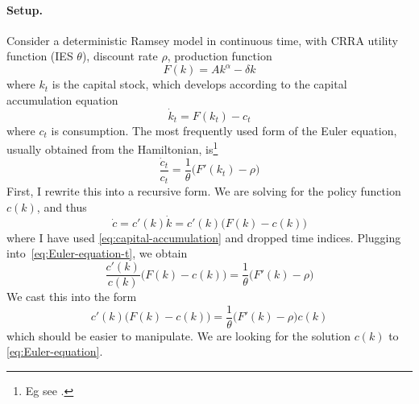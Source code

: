 \documentclass[a4paper,11pt]{article}
\begin{document}
\paragraph{Setup.} Consider a deterministic Ramsey model in continuous time, with CRRA utility function (IES $\theta$), discount rate $\rho$, production function
\begin{equation}
  F(k) = A k^\alpha - \delta k
\end{equation}
where $k_t$ is the capital stock, which develops according to the capital accumulation equation
\begin{equation}
  \label{eq:capital-accumulation}
  \dot{k}_t = F(k_t) - c_t
\end{equation}
where $c_t$ is consumption. The most frequently used form of the Euler equation, usually obtained from the Hamiltonian, is\footnote{Eg see \textcite[Chapter 8]{acemoglu2008introduction}.}
\begin{equation}
  \label{eq:Euler-equation-t}
  \frac{\dot{c}_t}{c_t} = \frac{1}{\theta} \bigl( F'(k_t) - \rho \bigr)
\end{equation}
First, I rewrite this into a recursive form. We are solving for the policy function $c(k)$, and thus
\begin{equation}
  \dot{c} = c'(k) \dot{k} = c'(k) \bigl( F(k) - c(k) \bigr)
\end{equation}
where I have used \eqref{eq:capital-accumulation} and dropped time indices. Plugging into~\eqref{eq:Euler-equation-t}, we obtain
\begin{equation}
  \label{eq:Euler-elasticity}
  \frac{c'(k)}{c(k)} \bigl( F(k) - c(k) \bigr) = \frac{1}{\theta} \bigl(F'(k)-\rho\bigr)
\end{equation}
We cast this into the form
\begin{equation}
  \label{eq:Euler-equation}
  c'(k) \bigl( F(k) - c(k) \bigr) = \frac{1}{\theta} \bigl(F'(k)-\rho\bigr) c(k)
\end{equation}
which should be easier to manipulate. We are looking for the solution $c(k)$ to \eqref{eq:Euler-equation}.
\end{document}
